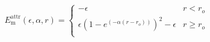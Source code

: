 \documentclass[12pt]{article}
\begin{document}
$$
    E_\text{m}^\text{attr}(\epsilon,\alpha,r) =
     \begin{cases}
     -\epsilon & r < r_{o} \\
     \epsilon\left( 1 - e^{ \left(-\alpha(r-r_{o}) \right)}\right)^2 -\epsilon & r \geq r_{o} \\
      \end{cases}
$$
\end{document}
